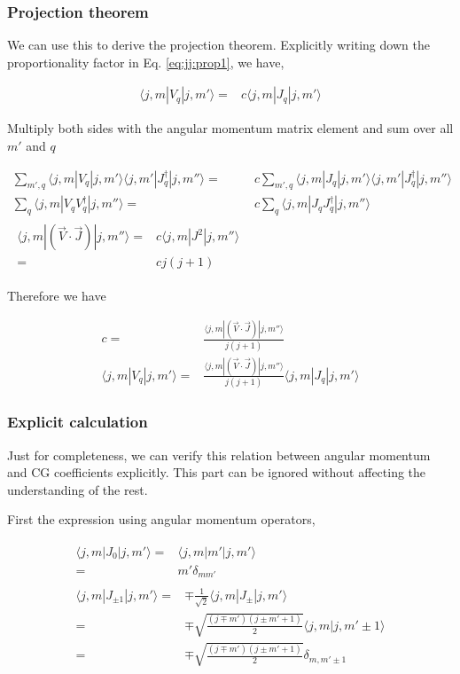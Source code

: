 \documentclass[10pt,fleqn]{article}
\newcommand{\eqar}[1]
{
  \begin{align}
    #1
  \end{align}
}
\begin{document}
\subsubsection{Projection theorem}
We can use this to derive the projection theorem.
Explicitly writing down the proportionality factor in Eq. \ref{eq:jj:prop1}, we have,
\eqar{
  \langle j,m|V_q|j,m'\rangle=&c\langle j,m|J_q|j,m'\rangle
}
Multiply both sides with the angular momentum matrix element
and sum over all $m'$ and $q$
\eqar{
  \sum_{m',q}\langle j,m|V_q|j,m'\rangle\langle j,m'|J_q^\dagger|j,m''\rangle=&c\sum_{m',q}\langle j,m|J_q|j,m'\rangle\langle j,m'|J_q^\dagger|j,m''\rangle\\
  \sum_q\langle j,m|V_qV_q^\dagger|j,m''\rangle=&c\sum_q\langle j,m|J_qJ_q^\dagger|j,m''\rangle\\
  \begin{split}
    \langle j,m|(\vec V\cdot \vec J)|j,m''\rangle=&c\langle j,m|J^2|j,m''\rangle\\
    =&c j(j+1)
  \end{split}
}
Therefore we have
\eqar{
  c=&\frac{\langle j,m|(\vec V\cdot \vec J)|j,m''\rangle}{j(j+1)}\\
  \langle j,m|V_q|j,m'\rangle=&\frac{\langle j,m|(\vec V\cdot \vec J)|j,m''\rangle}{j(j+1)}\langle j,m|J_q|j,m'\rangle
}

\subsubsection{Explicit calculation}
Just for completeness, we can verify this relation between angular momentum
and CG coefficients explicitly.
This part can be ignored without affecting the understanding of the rest.

First the expression using angular momentum operators,
\eqar{
  \begin{split}
    \langle j,m|J_0|j,m'\rangle=&\langle j,m|m'|j,m'\rangle\\
    =&m'\delta_{mm'}
  \end{split}\\
  \begin{split}
    \langle j,m|J_{\pm1}|j,m'\rangle=&\mp\frac{1}{\sqrt2}\langle j,m|J_{\pm}|j,m'\rangle\\
    =&\mp\sqrt{\frac{(j\mp m')(j\pm m' + 1)}{2}}\langle j,m|j,m'\pm1\rangle\\
    =&\mp\sqrt{\frac{(j\mp m')(j\pm m' + 1)}{2}}\delta_{m,m'\pm1}
  \end{split}
}
\end{document}
